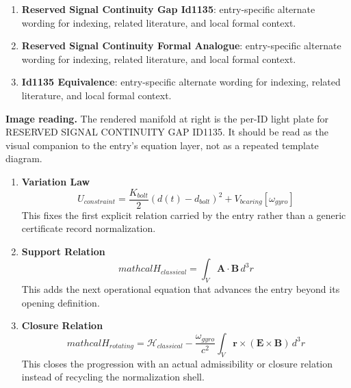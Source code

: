 \begin{enumerate}[leftmargin=1.6em,itemsep=6pt,topsep=4pt]
\item \textbf{Reserved Signal Continuity Gap Id1135}: entry-specific alternate wording for indexing, related literature, and local formal context.
\item \textbf{Reserved Signal Continuity Formal Analogue}: entry-specific alternate wording for indexing, related literature, and local formal context.
\item \textbf{Id1135 Equivalence}: entry-specific alternate wording for indexing, related literature, and local formal context.
\end{enumerate}

\begin{samepage}
\noindent\begin{minipage}[t]{0.45\linewidth}
\vspace{0pt}
\raggedright
\scriptsize\textbf{Image reading.} The rendered manifold at right is the per-ID light plate for RESERVED SIGNAL CONTINUITY GAP ID1135. It should be read as the visual companion to the entry's equation layer, not as a repeated template diagram.\par
\end{minipage}\hfill
\begin{minipage}[t]{0.53\linewidth}
\vspace*{-0.10in}
\raggedright
{}
\end{minipage}
\end{samepage}

\clearpage


\begin{enumerate}[leftmargin=1.6em,itemsep=9pt,topsep=6pt]
\item \textbf{Variation Law}
\[
U_{constraint} = \frac{K_{bolt}}{2}(d(t)-d_{bolt})^{2} + V_{bearing}[\omega_{gyro}]
\]
This fixes the first explicit relation carried by the entry rather than a generic certificate record normalization.

\item \textbf{Support Relation}
\[
mathcal{H}_{classical} = \int_V \mathbf{A} \cdot \mathbf{B} \, d^3r
\]
This adds the next operational equation that advances the entry beyond its opening definition.

\item \textbf{Closure Relation}
\[
mathcal{H}_{rotating} = \mathcal{H}_{classical} - \frac{\omega_{gyro}}{c^2}\int_V \mathbf{r} \times (\mathbf{E} \times \mathbf{B}) \, d^3r
\]
This closes the progression with an actual admissibility or closure relation instead of recycling the normalization shell.
\end{enumerate}

